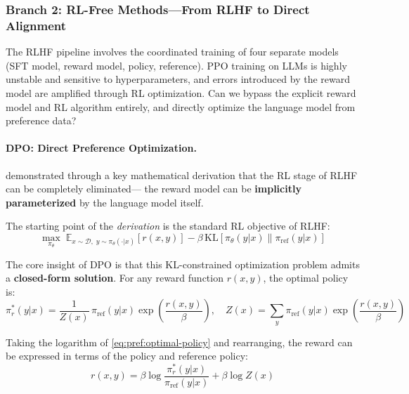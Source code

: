 \subsubsection{Branch 2: RL-Free Methods---From RLHF to Direct Alignment}
\label{sec:t2-rlfree}

\begin{problembox}
The RLHF pipeline involves the coordinated training of four separate models (SFT model, reward model, policy, reference).
PPO training on LLMs is highly unstable and sensitive to hyperparameters,
and errors introduced by the reward model are amplified through RL optimization.
Can we bypass the explicit reward model and RL algorithm entirely,
and directly optimize the language model from preference data?
\end{problembox}

\paragraph{DPO: Direct Preference Optimization.}
 demonstrated through a key mathematical derivation
that the RL stage of RLHF can be completely eliminated---
the reward model can be \textbf{implicitly parameterized} by the language model itself.

The starting point of the \textit{derivation} is the standard RL objective of RLHF:
\begin{equation}
\label{eq:pref:rl-obj}
\max_{\pi_\theta}\; \mathbb{E}_{x \sim \mathcal{D},\; y \sim \pi_\theta(\cdot|x)} \left[
  r(x, y)
\right] - \beta\, \text{KL}\!\left[\pi_\theta(y|x) \| \pi_{\text{ref}}(y|x)\right]
\end{equation}

The core insight of DPO is that this KL-constrained optimization problem admits a \textbf{closed-form solution}.
For any reward function $r(x, y)$, the optimal policy is:
\begin{equation}
\label{eq:pref:optimal-policy}
\pi_r^*(y|x) = \frac{1}{Z(x)}\, \pi_{\text{ref}}(y|x) \exp\!\left(\frac{r(x, y)}{\beta}\right),
\quad Z(x) = \sum_y \pi_{\text{ref}}(y|x) \exp\!\left(\frac{r(x, y)}{\beta}\right)
\end{equation}

Taking the logarithm of \cref{eq:pref:optimal-policy} and rearranging, the reward can be expressed in terms of the policy and reference policy:
\begin{equation}
\label{eq:pref:reward-reparameterization}
r(x, y) = \beta \log \frac{\pi_r^*(y|x)}{\pi_{\text{ref}}(y|x)} + \beta \log Z(x)
\end{equation}

